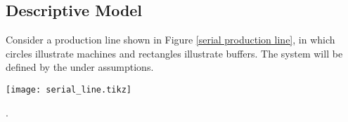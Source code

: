 \subsection{Descriptive Model}
\noindent Consider a production line shown in Figure \ref{serial production line}, in which circles illustrate machines and rectangles illustrate buffers. The system will be defined by the under assumptions.

\begin{figure*}[!ht]
	\centering
	\texttt{[image: serial\_line.tikz]}
	\caption{Serial production line.}
	\label{serial production line}.
\end{figure*}


